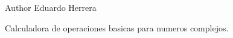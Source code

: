 \begin{DoxyAuthor}{Author}
Eduardo Herrera
\end{DoxyAuthor}
Calculadora de operaciones basicas para numeros complejos. 